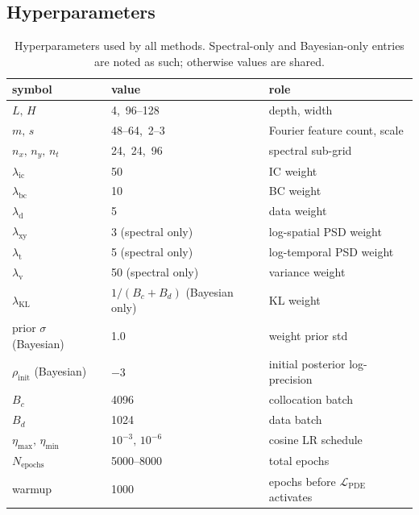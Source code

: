 \documentclass[review,12pt]{elsarticle}
\begin{document}
\subsection{Hyperparameters}
\label{subsec:hyper}

\begin{table}[h]
\centering
\caption{Hyperparameters used by all methods. Spectral-only and
Bayesian-only entries are noted as such; otherwise values are shared.}
\label{tab:hyper}
\begin{tabular}{l l l}
\toprule
symbol & value & role \\
\midrule
\(L,\,H\)                    & 4,\, 96--128 & depth, width \\
\(m,\,s\)                    & 48--64,\, 2--3 & Fourier feature count, scale \\
\(n_x,\,n_y,\,n_t\)          & 24,\, 24,\, 96 & spectral sub-grid \\
\(\lambda_{\mathrm{ic}}\)    & 50 & IC weight \\
\(\lambda_{\mathrm{bc}}\)    & 10 & BC weight \\
\(\lambda_{\mathrm d}\)      & 5  & data weight \\
\(\lambda_{\mathrm{xy}}\)    & 3 (spectral only) & log-spatial PSD weight \\
\(\lambda_{\mathrm{t}}\)     & 5 (spectral only) & log-temporal PSD weight \\
\(\lambda_{\mathrm{v}}\)     & 50 (spectral only) & variance weight \\
\(\lambda_{\mathrm{KL}}\)    & \(1/(B_c+B_d)\) (Bayesian only) & KL weight \\
prior \(\sigma\) (Bayesian)  & 1.0 & weight prior std \\
\(\rho_{\mathrm{init}}\) (Bayesian) & \(-3\) & initial posterior log-precision \\
\(B_c\)                      & 4096 & collocation batch \\
\(B_d\)                      & 1024 & data batch \\
\(\eta_{\max},\,\eta_{\min}\)& \(10^{-3},\,10^{-6}\) & cosine LR schedule \\
\(N_{\mathrm{epochs}}\)      & 5000--8000 & total epochs \\
warmup                       & 1000 & epochs before \(\mathcal L_{\mathrm{PDE}}\) activates \\
\bottomrule
\end{tabular}
\end{table}
\end{document}
